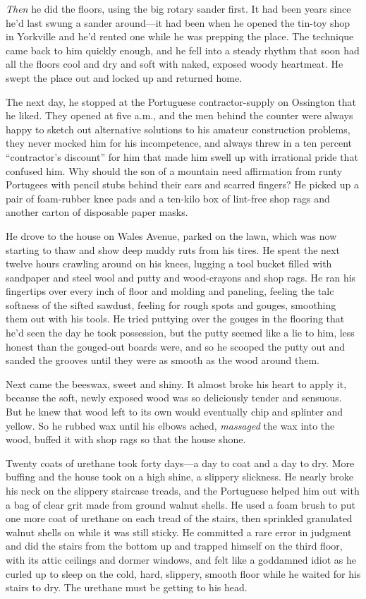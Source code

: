 \textit{Then} he did the floors, using the big rotary sander first. 
It had been years since he'd last swung a sander around---it had been
when he opened the tin-toy shop in Yorkville and he'd rented one while
he was prepping the place.  The technique came back to him quickly
enough, and he fell into a steady rhythm that soon had all the floors
cool and dry and soft with naked, exposed woody heartmeat.  He swept
the place out and locked up and returned home.

The next day, he stopped at the Portuguese contractor-supply on
Ossington that he liked.  They opened at five a.m., and the men behind
the counter were always happy to sketch out alternative solutions to
his amateur construction problems, they never mocked him for his
incompetence, and always threw in a ten percent ``contractor's
discount'' for him that made him swell up with irrational pride that
confused him.  Why should the son of a mountain need affirmation from
runty Portugees with pencil stubs behind their ears and scarred
fingers?  He picked up a pair of foam-rubber knee pads and a ten-kilo
box of lint-free shop rags and another carton of disposable paper
masks.

He drove to the house on Wales Avenue, parked on the lawn, which was
now starting to thaw and show deep muddy ruts from his tires.  He
spent the next twelve hours crawling around on his knees, lugging a
tool bucket filled with sandpaper and steel wool and putty and
wood-crayons and shop rags.  He ran his fingertips over every inch of
floor and molding and paneling, feeling the talc softness of the
sifted sawdust, feeling for rough spots and gouges, smoothing them out
with his tools.  He tried puttying over the gouges in the flooring
that he'd seen the day he took possession, but the putty seemed like a
lie to him, less honest than the gouged-out boards were, and so he
scooped the putty out and sanded the grooves until they were as smooth
as the wood around them.

Next came the beeswax, sweet and shiny.  It almost broke his heart to
apply it, because the soft, newly exposed wood was so deliciously
tender and sensuous.  But he knew that wood left to its own would
eventually chip and splinter and yellow.  So he rubbed wax until his
elbows ached, \textit{massaged} the wax into the wood, buffed it with
shop rags so that the house shone.

Twenty coats of urethane took forty days---a day to coat and a day to
dry.  More buffing and the house took on a high shine, a slippery
slickness.  He nearly broke his neck on the slippery staircase treads,
and the Portuguese helped him out with a bag of clear grit made from
ground walnut shells.  He used a foam brush to put one more coat of
urethane on each tread of the stairs, then sprinkled granulated walnut
shells on while it was still sticky.  He committed a rare error in
judgment and did the stairs from the bottom up and trapped himself on
the third floor, with its attic ceilings and dormer windows, and felt
like a goddamned idiot as he curled up to sleep on the cold, hard,
slippery, smooth floor while he waited for his stairs to dry.  The
urethane must be getting to his head.

